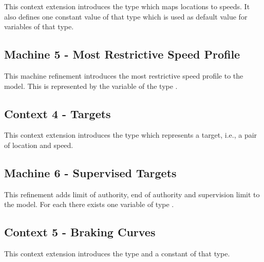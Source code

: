 \documentclass{template/openetcs_article}
\begin{document}
This context extension introduces the type  which maps
locations to speeds. It also defines one constant value of that type which is
used as default value for variables of that type.

{\footnotesize

}

\subsection{Machine 5 - Most Restrictive Speed Profile}
\label{sec:machine-5-most}

This machine refinement introduces the most restrictive speed profile to the
model. This is represented by the variable  of the type
.

{\footnotesize

}

\subsection{Context 4 - Targets}
\label{sec:context-4-targets}

This context extension introduces the type  which represents a
target, i.e., a pair of location and speed.

{\footnotesize

}

\subsection{Machine 6 - Supervised Targets}
\label{sec:machine-6-supervised}

This refinement adds limit of authority, end of authority and supervision limit
to the model. For each there exists one variable of type .

{\footnotesize

}

\subsection{Context 5 - Braking Curves}
\label{sec:context-5-braking}

This context extension introduces the type  and a
constant of that type.
\end{document}
